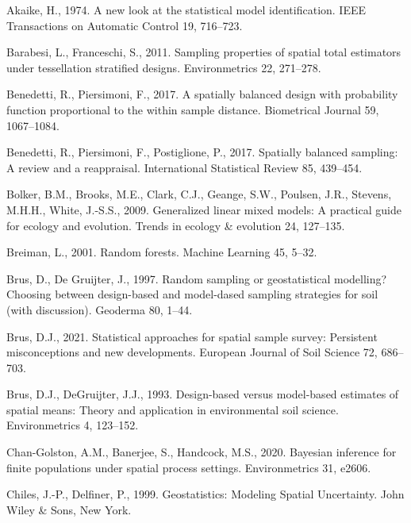 \documentclass[]{elsarticle} %
\begin{document}
\hypertarget{refs}{}
\leavevmode\hypertarget{ref-akaike1974new}{}%
Akaike, H., 1974. A new look at the statistical model identification.
IEEE Transactions on Automatic Control 19, 716--723.

\leavevmode\hypertarget{ref-barabesi2011sampling}{}%
Barabesi, L., Franceschi, S., 2011. Sampling properties of spatial total
estimators under tessellation stratified designs. Environmetrics 22,
271--278.

\leavevmode\hypertarget{ref-benedetti2017spatially}{}%
Benedetti, R., Piersimoni, F., 2017. A spatially balanced design with
probability function proportional to the within sample distance.
Biometrical Journal 59, 1067--1084.

\leavevmode\hypertarget{ref-benedetti2017spatiallyreview}{}%
Benedetti, R., Piersimoni, F., Postiglione, P., 2017. Spatially balanced
sampling: A review and a reappraisal. International Statistical Review
85, 439--454.

\leavevmode\hypertarget{ref-bolker2009generalized}{}%
Bolker, B.M., Brooks, M.E., Clark, C.J., Geange, S.W., Poulsen, J.R.,
Stevens, M.H.H., White, J.-S.S., 2009. Generalized linear mixed models:
A practical guide for ecology and evolution. Trends in ecology \&
evolution 24, 127--135.

\leavevmode\hypertarget{ref-breiman2001random}{}%
Breiman, L., 2001. Random forests. Machine Learning 45, 5--32.

\leavevmode\hypertarget{ref-brus1997random}{}%
Brus, D., De Gruijter, J., 1997. Random sampling or geostatistical
modelling? Choosing between design-based and model-dased sampling
strategies for soil (with discussion). Geoderma 80, 1--44.

\leavevmode\hypertarget{ref-brus2021statistical}{}%
Brus, D.J., 2021. Statistical approaches for spatial sample survey:
Persistent misconceptions and new developments. European Journal of Soil
Science 72, 686--703.

\leavevmode\hypertarget{ref-brus1993design}{}%
Brus, D.J., DeGruijter, J.J., 1993. Design-based versus model-based
estimates of spatial means: Theory and application in environmental soil
science. Environmetrics 4, 123--152.

\leavevmode\hypertarget{ref-chan2020bayesian}{}%
Chan-Golston, A.M., Banerjee, S., Handcock, M.S., 2020. Bayesian
inference for finite populations under spatial process settings.
Environmetrics 31, e2606.

\leavevmode\hypertarget{ref-chiles1999geostatistics}{}%
Chiles, J.-P., Delfiner, P., 1999. Geostatistics: Modeling Spatial
Uncertainty. John Wiley \& Sons, New York.
\end{document}
